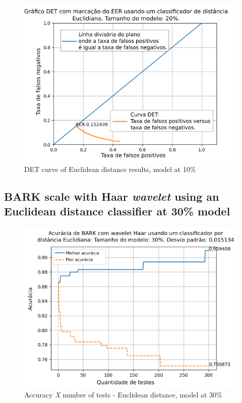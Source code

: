 \begin{figure}[!ht]
	\centering
	\includegraphics[width=.9\linewidth]{images/results/det/DET_for_classifier_Euclidian_20}
	\caption{DET curve of Euclidean distance results, model at 10\%}
	\label{fig:detforclassifiereuclidian20}
\end{figure}

\subsection{BARK scale with Haar \textit{wavelet} using an Euclidean distance classifier at 30\% model}



\begin{figure}[ht]
	\centering
	\includegraphics[width=\linewidth]{images/results/confusionMatrices/classifier_Euclidian_30}
	\caption{Accuracy \textit{X} number of tests - Euclidean distance, model at 30\%}
	\label{fig:classifiereuclidian30}
\end{figure}

